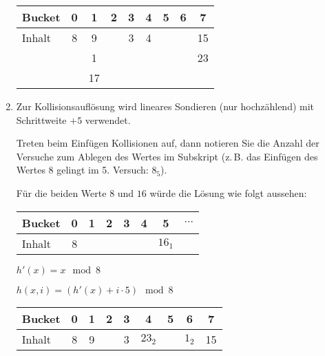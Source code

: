 \documentclass{lehramt-informatik-aufgabe}
\begin{document}
\begin{enumerate}
\begin{antwort}
\begin{center}
\begin{tabular}{l|cccccccc}
Bucket & 0 & 1 & 2 & 3 & 4 & 5 & 6 & 7  \\\hline
Inhalt & 8 & 9 &   & 3 & 4 &   &   & 15 \\
       &   & 1 &   &   &   &   &   & 23 \\
       &   & 17 &  &   &   &   &   &    \\
\end{tabular}
\end{center}
\end{antwort}


\item {}

Zur Kollisionsauflösung wird lineares Sondieren (nur hochzählend) mit
Schrittweite $+5$ verwendet.

Treten beim Einfügen Kollisionen auf, dann notieren Sie die Anzahl der
Versuche zum Ablegen des Wertes im Subskript (z.\,B. das Einfügen des
Wertes 8 gelingt im 5. Versuch: $8_5$).


Für die beiden Werte $8$ und $16$ würde die Lösung wie folgt aussehen:

\begin{center}
\begin{tabular}{l|ccccccc}
Bucket    & 0  & 1      & 2 & 3 & 4 & 5 &  $\cdots$  \\\hline
Inhalt    & 8 & &&&& $16_1$\\
\end{tabular}
\end{center}

\begin{antwort}
$h'(x) = x \mod 8$

$h(x, i) = (h'(x) + i \cdot 5) \mod 8$




\begin{center}
\begin{tabular}{l|cccccccc}
Bucket    & 0  & 1 & 2     & 3 & 4      & 5 & 6     & 7 \\\hline
Inhalt    & 8  & 9 &       & 3 & $23_2$ &   & $1_2$ & 15 \\
\end{tabular}
\end{center}


\end{antwort}
\end{enumerate}
\end{document}
